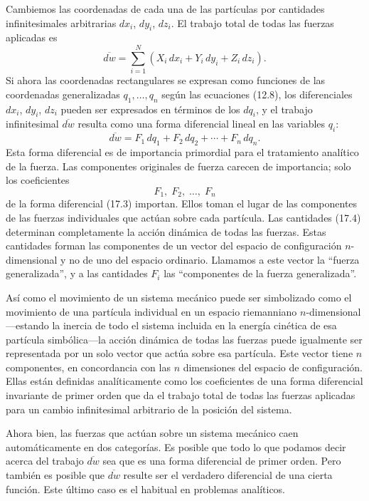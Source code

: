 \documentclass[12pt,a4paper]{book}
\begin{document}
\begin{center}
Cambiemos las coordenadas de cada una de las part\'iculas por cantidades infinitesimales arbitrarias $dx_i$, $dy_i$, $dz_i$. El trabajo total de todas las fuerzas aplicadas es
\begin{equation}
\overline{dw} = \sum_{i=1}^{N} (X_i\,dx_i + Y_i\,dy_i + Z_i\,dz_i).
\tag{17.2}
\end{equation}
Si ahora las coordenadas rectangulares se expresan como funciones de las coordenadas generalizadas $q_1, \ldots, q_n$ seg\'un las ecuaciones (12.8), los diferenciales $dx_i$, $dy_i$, $dz_i$ pueden ser expresados en t\'erminos de los $dq_i$, y el trabajo infinitesimal $\overline{dw}$ resulta como una forma diferencial lineal en las variables $q_i$:
\begin{equation}
\overline{dw} = F_1\,dq_1 + F_2\,dq_2 + \cdots + F_n\,dq_n.
\tag{17.3}
\end{equation}
Esta forma diferencial es de importancia primordial para el tratamiento anal\'itico de la fuerza. Las componentes originales de fuerza carecen de importancia; solo los coeficientes
\begin{equation}
F_1,\; F_2,\; \ldots,\; F_n
\tag{17.4}
\end{equation}
de la forma diferencial (17.3) importan. Ellos toman el lugar de las componentes de las fuerzas individuales que act\'uan sobre cada part\'icula. Las cantidades (17.4) determinan completamente la acci\'on din\'amica de todas las fuerzas. Estas cantidades forman las componentes de un vector del espacio de configuraci\'on $n$-dimensional y no de uno del espacio ordinario. Llamamos a este vector la ``fuerza generalizada'', y a las cantidades $F_i$ las ``componentes de la fuerza generalizada''.

As\'i como el movimiento de un sistema mec\'anico puede ser simbolizado como el movimiento de una part\'icula individual en un espacio riemanniano $n$-dimensional---estando la inercia de todo el sistema incluida en la energ\'ia cin\'etica de esa part\'icula simb\'olica---la acci\'on din\'amica de todas las fuerzas puede igualmente ser representada por un solo vector que act\'ua sobre esa part\'icula. Este vector tiene $n$ componentes, en concordancia con las $n$ dimensiones del espacio de configuraci\'on. Ellas est\'an definidas anal\'iticamente como los coeficientes de una forma diferencial invariante de primer orden que da el trabajo total de todas las fuerzas aplicadas para un cambio infinitesimal arbitrario de la posici\'on del sistema.

Ahora bien, las fuerzas que act\'uan sobre un sistema mec\'anico caen autom\'aticamente en dos categor\'ias. Es posible que todo lo que podamos decir acerca del trabajo $\overline{dw}$ sea que es una forma diferencial de primer orden. Pero tambi\'en es posible que $\overline{dw}$ resulte ser el verdadero diferencial de una cierta funci\'on. Este \'ultimo caso es el habitual en problemas anal\'iticos.


\end{center}
\end{document}
